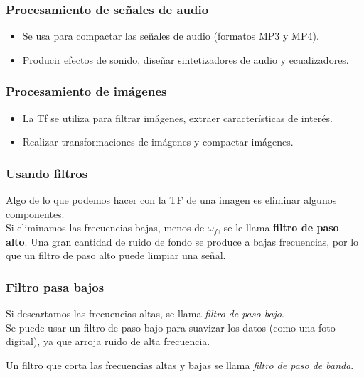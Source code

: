 \begin{frame}
\frametitle{Procesamiento de señales de audio}
\begin{itemize}[<+->]
\item Se usa para compactar las señales de audio (formatos MP3 y MP4).
\item Producir efectos de sonido, diseñar sintetizadores de audio y ecualizadores.
\end{itemize}
\end{frame}
\begin{frame}
\frametitle{Procesamiento de imágenes}
\begin{itemize}[<+->]
\item La Tf se utiliza para filtrar imágenes, extraer características de interés.
\item Realizar transformaciones de imágenes y compactar imágenes.
\end{itemize}
\end{frame}
\begin{frame}
\frametitle{Usando filtros}
Algo de lo que podemos hacer con la TF de una imagen es eliminar algunos componentes.
\\
\bigskip
\pause
Si eliminamos las frecuencias bajas, menos de $\omega_{f}$, se le llama \textbf{filtro de paso alto}. Una gran cantidad de ruido de fondo se produce a bajas frecuencias, por lo que un filtro de paso alto puede limpiar una señal.
\end{frame}
\begin{frame}
\frametitle{Filtro pasa bajos}
 Si descartamos las frecuencias altas, se llama \emph{filtro de paso bajo}.
 \\
 \bigskip
 \pause
 Se puede usar un filtro de paso bajo para suavizar los datos (como una foto digital), ya que arroja ruido de alta frecuencia.
 
 Un filtro que corta las frecuencias altas y bajas se llama \emph{filtro de paso de banda}.
\end{frame}
